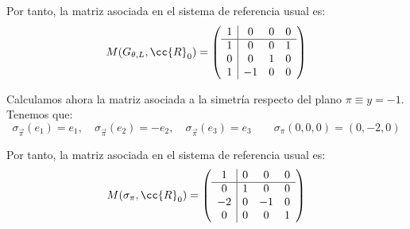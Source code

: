 \begin{ejercicio}
    Por tanto, la matriz asociada en el sistema de referencia usual es:
    \begin{equation*}
        M(G_{\theta, {L}}, \cc{R}_0) = \left(
        \begin{array}{c|ccc}
            1 & 0 & 0 & 0 \\ \hline
            1 & 0 & 0 & 1 \\
            0 & 0 & 1 & 0 \\
            1 & -1 & 0 & 0
        \end{array}
        \right)
    \end{equation*}

    Calculamos ahora la matriz asociada a la simetría respecto del plano $\pi\equiv y=-1$. Tenemos que:
    \begin{equation*}
        \sigma_{\vec{\pi}}(e_1) = e_1, \quad \sigma_{\vec{\pi}}(e_2) = -e_2, \quad \sigma_{\vec{\pi}}(e_3) = e_3 \qquad \sigma_{{\pi}}(0,0,0) = (0,-2,0)
    \end{equation*}

    Por tanto, la matriz asociada en el sistema de referencia usual es:
    \begin{equation*}
        M(\sigma_{{\pi}}, \cc{R}_0) = \left(
        \begin{array}{c|ccc}
            1 & 0 & 0 & 0 \\ \hline
            0 & 1 & 0 & 0 \\
            -2 & 0 & -1 & 0 \\
            0 & 0 & 0 & 1
        \end{array}
        \right)
    \end{equation*}


\end{ejercicio}
